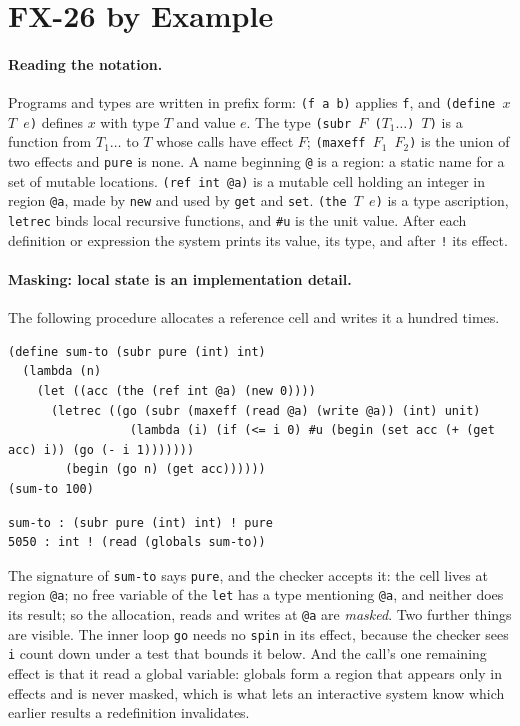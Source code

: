 \documentclass[acmsmall,screen,review]{acmart}
\newcommand{\cd}[1]{\texttt{#1}}
\begin{document}
\section{FX-26 by Example}
\label{sec:overview}

\paragraph{Reading the notation.} Programs and types are written in
prefix form: \cd{(f a b)} applies \cd{f}, and
\cd{(define $x$ $T$ $e$)} defines $x$ with type $T$ and value $e$.
The type \cd{(subr $F$ ($T_1 \ldots$) $T$)} is a function from
$T_1 \ldots$ to $T$ whose calls have effect $F$; \cd{(maxeff $F_1$
$F_2$)} is the union of two effects and \cd{pure} is none. A name
beginning \cd{@} is a region: a static name for a set of mutable
locations. \cd{(ref int @a)} is a mutable cell holding an integer in
region \cd{@a}, made by \cd{new} and used by \cd{get} and \cd{set}.
\cd{(the $T$ $e$)} is a type ascription, \cd{letrec} binds local
recursive functions, and \cd{\#u} is the unit value. After each
definition or expression the system prints its value, its type, and
after \cd{!} its effect.


\paragraph{Masking: local state is an implementation detail.}
The following procedure allocates a reference cell and writes it a
hundred times.

\begin{lstlisting}
(define sum-to (subr pure (int) int)
  (lambda (n)
    (let ((acc (the (ref int @a) (new 0))))
      (letrec ((go (subr (maxeff (read @a) (write @a)) (int) unit)
                 (lambda (i) (if (<= i 0) #u (begin (set acc (+ (get acc) i)) (go (- i 1)))))))
        (begin (go n) (get acc))))))
(sum-to 100)
\end{lstlisting}
\begin{lstlisting}[style=out]
sum-to : (subr pure (int) int) ! pure
5050 : int ! (read (globals sum-to))
\end{lstlisting}
The signature of
\cd{sum-to} says \cd{pure}, and the checker accepts it: the cell lives
at region \cd{@a}; no free variable of the \cd{let} has a type
mentioning \cd{@a}, and neither does its result; so the allocation,
reads and writes at \cd{@a} are \emph{masked}. Two further things are
visible. The inner loop \cd{go} needs no \cd{spin} in its effect,
because the checker sees \cd{i} count down under a test that bounds it
below. And the call's one remaining effect is that it read a global
variable: globals form a region that appears only in effects and is
never masked, which is what lets an interactive system know which
earlier results a redefinition invalidates.
\end{document}
